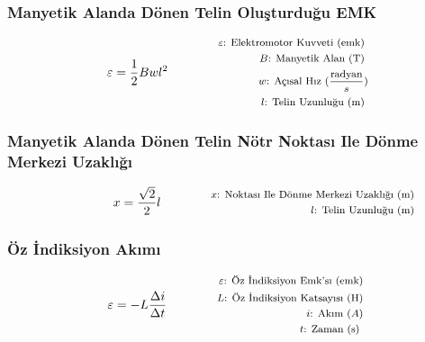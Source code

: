 \subsubsection*{Manyetik Alanda Dönen Telin Oluşturduğu EMK}
\begin{equation}
    \varepsilon = \frac{1}{2} Bwl^2 \qquad \qquad \parbox{4cm}{\footnotesize$\begin{aligned}
        \varepsilon\text{: Elektromotor Kuvveti (emk) } \\
        B\text{: Manyetik Alan (T) } \\
        w\text{: Açısal Hız } (\frac{\text{radyan}}{s}) \\
        l\text{: Telin Uzunluğu (m) }
\end{aligned}$}
\end{equation}

\subsubsection*{Manyetik Alanda Dönen Telin Nötr Noktası Ile Dönme Merkezi Uzaklığı}
\begin{equation}
    x = \frac{\sqrt{2}}{2} l \qquad \qquad \parbox{4cm}{\footnotesize$\begin{aligned}
        x\text{: Noktası Ile Dönme Merkezi Uzaklığı (m) } \\
        l\text{: Telin Uzunluğu (m) }
\end{aligned}$}
\end{equation}

\subsubsection*{Öz İndiksiyon Akımı}
\begin{equation}
    \varepsilon = -L \frac{\Delta i}{ \Delta t }\qquad \qquad \parbox{4cm}{\footnotesize$\begin{aligned}
        \varepsilon\text{: Öz İndiksiyon Emk'sı (emk)} \\
        L\text{: Öz İndiksiyon Katsayısı (H)} \\
        i\text{: Akım } (A)  \\
        t\text{: Zaman (s) }
\end{aligned}$}
\end{equation}
